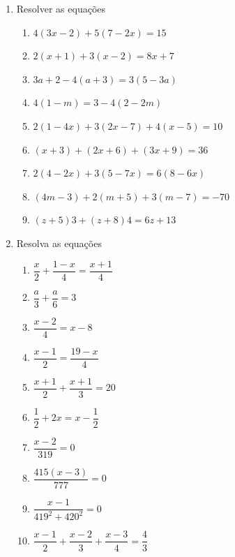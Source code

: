 \documentclass[a4paper,12pt]{article}
\begin{document}
\begin{enumerate}
			\item Resolver as equações
			\begin{enumerate}[label=(\alph*), itemsep=1em]
				\item $4(3x-2)+5(7-2x)=15$
				\item $2(x+1)+3(x-2)=8x+7$
				\item $3a+2-4(a+3)=3(5-3a)$
				\item $4(1-m)=3-4(2-2m)$
				\item $2(1-4x)+3(2x-7)+4(x-5)=10$
				\item $(x+3)+(2x+6)+(3x+9)=36$
				\item $2(4-2x)+3(5-7x)=6(8-6x)$
				\item $(4m-3)+2(m+5)+3(m-7)=-70$
				\item $(z+5)3+(z+8)4=6z+13$
			\end{enumerate}

			\item Resolva as equações
			
			
			\begin{enumerate}[label=(\alph*), itemsep=1em]
				\item $\dfrac{x}{2}+\dfrac{1-x}{4}=\dfrac{x+1}{4}$
				\item $\dfrac{a}{3}+\dfrac{a}{6}=3$
				\item $\dfrac{x-2}{4}=x-8$
				\item $\dfrac{x-1}{2}=\dfrac{19-x}{4}$
				\item $\dfrac{x+1}{2}+\dfrac{x+1}{3}=20$
				\item $\dfrac{1}{2}+2x=x-\dfrac{1}{2}$
				\item $\dfrac{x-2}{319}=0$
				\item $\dfrac{415(x-3)}{777}=0$
				\item $\dfrac{x-1}{419^{2}+420^{2}}=0$
				\item $\dfrac{x-1}{2}+\dfrac{x-2}{3}+\dfrac{x-3}{4}=\dfrac{4}{3}$
			\end{enumerate}

			


		\end{enumerate}
	
\end{document}
